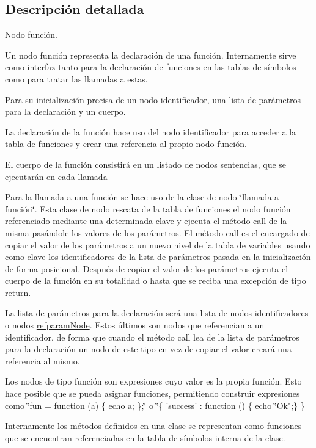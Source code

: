 \subsection{Descripción detallada}
Nodo función. 

Un nodo función representa la declaración de una función. Internamente sirve como interfaz tanto para la declaración de funciones en las tablas de símbolos como para tratar las llamadas a estas.

Para su inicialización precisa de un nodo identificador, una lista de parámetros para la declaración y un cuerpo.

La declaración de la función hace uso del nodo identificador para acceder a la tabla de funciones y crear una referencia al propio nodo función.

El cuerpo de la función consistirá en un listado de nodos sentencias, que se ejecutarán en cada llamada

Para la llamada a una función se hace uso de la clase de nodo \char`\"{}llamada a función\char`\"{}. Esta clase de nodo rescata de la tabla de funciones el nodo función referenciado mediante una determinada clave y ejecuta el método call de la misma pasándole los valores de los parámetros. El método call es el encargado de copiar el valor de los parámetros a un nuevo nivel de la tabla de variables usando como clave los identificadores de la lista de parámetros pasada en la inicialización de forma posicional. Después de copiar el valor de los parámetros ejecuta el cuerpo de la función en su totalidad o hasta que se reciba una excepción de tipo return.

La lista de parámetros para la declaración será una lista de nodos identificadores o nodos \hyperlink{classrefparamNode}{refparam\-Node}. Estos últimos son nodos que referencian a un identificador, de forma que cuando el método call lea de la lista de parámetros para la declaración un nodo de este tipo en vez de copiar el valor creará una referencia al mismo.

Los nodos de tipo función son expresiones cuyo valor es la propia función. Esto hace posible que se pueda asignar funciones, permitiendo construir expresiones como \char`\"{}fun = function (a) \{ echo a; \};\char`\"{} o \char`\"{}\{ 'success' \-: function () \{ echo \char`\"{}Ok";\} \}

Internamente los métodos definidos en una clase se representan como funciones que se encuentran referenciadas en la tabla de símbolos interna de la clase. 

